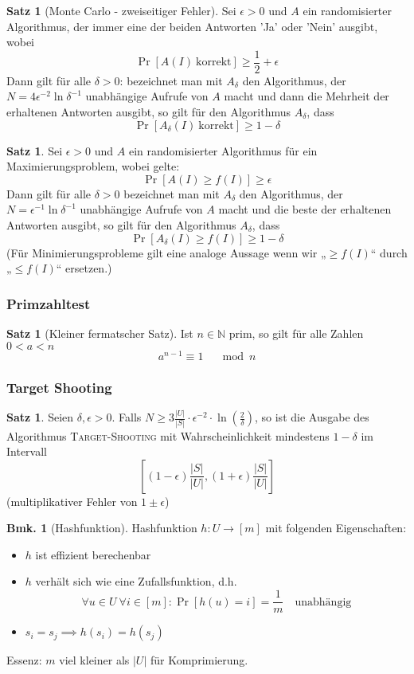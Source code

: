 \documentclass[a4paper, 10pt]{article}
\theoremstyle{definition}
\newtheorem{theorem}[definition]{Satz}
\newtheorem*{note}{Bmk.}
\theoremstyle{named}
\newcommand{\N}{\mathbb{N}}
\begin{document}
\begin{theorem}[Monte Carlo - zweiseitiger Fehler]
    Sei $\epsilon > 0$ und $A$ ein randomisierter Algorithmus, der immer eine der beiden Antworten 'Ja' oder 'Nein' ausgibt, wobei
    $$\Pr[A(I) \ \text{korrekt}] \geq \frac{1}{2} + \epsilon$$
    Dann gilt für alle $\delta > 0$: bezeichnet man mit $A_\delta$ den Algorithmus, der $N = 4 \epsilon^{-2}\ln \delta^{-1}$ unabhängige Aufrufe von $A$ macht und dann die Mehrheit der erhaltenen Antworten ausgibt, so gilt für den Algorithmus $A_\delta$, dass
    $$\Pr[A_\delta(I) \ \text{korrekt}] \geq 1 - \delta$$
\end{theorem}

\begin{theorem}
    Sei $\epsilon > 0$ und $A$ ein randomisierter Algorithmus für ein Maximierungsproblem, wobei gelte: $$\Pr[A(I) \geq f(I)] \geq \epsilon$$ Dann gilt für alle $\delta > 0$ bezeichnet man mit $A_\delta$ den Algorithmus, der $N = \epsilon^{-1}\ln \delta^{-1}$ unabhängige Aufrufe von $A$ macht und die beste der erhaltenen Antworten ausgibt, so gilt für den Algorithmus $A_\delta$, dass $$\Pr[A_\delta(I) \geq f(I)] \geq 1 -\delta$$ (Für Minimierungsprobleme gilt eine analoge Aussage wenn wir „$\geq f(I)$“ durch „$\leq f(I)$“ ersetzen.)
\end{theorem}

\subsubsection{Primzahltest}
\begin{theorem}[Kleiner fermatscher Satz]
    Ist $n \in \N$ prim, so gilt für alle Zahlen $0 < a < n$
    $$a^{n - 1} \equiv 1 \quad \mod n$$
\end{theorem}

\subsubsection{Target Shooting}
\setcounter{definition}{78}
\begin{theorem}
    Seien $\delta, \epsilon > 0$. Falls $N \geq 3 \frac{|U|}{|S|} \cdot \epsilon^{-2} \cdot \ln(\frac{2}{\delta})$, so ist die Ausgabe des Algorithmus \textsc{Target-Shooting} mit Wahrscheinlichkeit mindestens $1 - \delta$ im Intervall $$\left[(1-\epsilon)\frac{|S|}{|U|}, (1 + \epsilon) \frac{|S|}{|U|}\right]$$
    (multiplikativer Fehler von $1 \pm \epsilon$)
\end{theorem}

\begin{note}[Hashfunktion]
    Hashfunktion $h: U \to [m]$ mit folgenden Eigenschaften:
    \begin{itemize}
        \item $h$ ist effizient berechenbar
        \item $h$ verhält sich wie eine Zufallsfunktion, d.h.
        $$\forall u \in U \ \forall i \in [m] : \Pr[h(u) = i] = \frac{1}{m} \quad \text{unabhängig}$$
        \item $s_i = s_j \implies h(s_i) = h(s_j)$
    \end{itemize}
    Essenz: $m$ viel kleiner als $|U|$ für Komprimierung.
\end{note}
\end{document}
